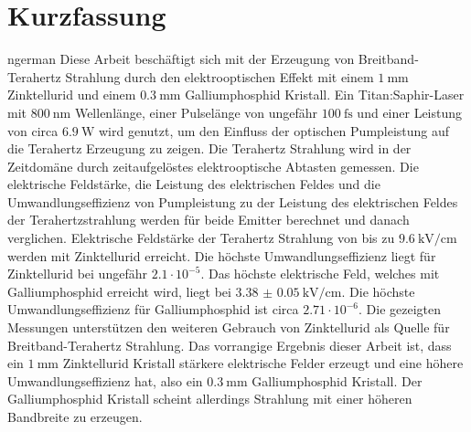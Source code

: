 \section*{Kurzfassung}
\begin{foreignlanguage}{ngerman}
Diese Arbeit beschäftigt sich mit der Erzeugung von Breitband-Terahertz Strahlung durch den elektrooptischen Effekt mit einem $\SI{1}{\milli\meter}$ Zinktellurid und einem $\SI{0.3}{\milli\meter}$ Galliumphosphid Kristall.
Ein Titan:Saphir-Laser mit $\SI{800}{\nano\meter}$ Wellenlänge, einer Pulselänge von ungefähr $\SI{100}{\femto\second}$ und einer Leistung von circa $\SI{6.9}{\W}$ wird genutzt, um den Einfluss der optischen Pumpleistung auf die Terahertz Erzeugung zu zeigen.
Die Terahertz Strahlung wird in der Zeitdomäne durch zeitaufgelöstes elektrooptische Abtasten gemessen.
Die elektrische Feldstärke, die Leistung des elektrischen Feldes und die Umwandlungseffizienz von Pumpleistung zu der Leistung des elektrischen Feldes der Terahertzstrahlung werden für beide Emitter berechnet und danach verglichen.
Elektrische Feldstärke der Terahertz Strahlung von bis zu $\SI{9.6}{\kilo\V\per\centi\meter}$ werden mit Zinktellurid erreicht.
Die höchste Umwandlungseffizienz liegt für Zinktellurid bei ungefähr $2.1\cdot 10^{-5}$.
Das höchste elektrische Feld, welches mit Galliumphosphid erreicht wird, liegt bei $\SI{3.38(5)}{\kilo\V\per\centi\meter}$.
Die höchste Umwandlungseffizienz für Galliumphosphid ist circa $2.71\cdot 10^{-6}$.
Die gezeigten Messungen unterstützen den weiteren Gebrauch von Zinktellurid als Quelle für Breitband-Terahertz Strahlung.
Das vorrangige Ergebnis dieser Arbeit ist, dass ein  $\SI{1}{\milli\meter}$ Zinktellurid Kristall stärkere elektrische Felder erzeugt und eine höhere Umwandlungseffizienz hat, also ein $\SI{0.3}{\milli\meter}$ Galliumphosphid Kristall.
Der Galliumphosphid Kristall scheint allerdings Strahlung mit einer höheren Bandbreite zu erzeugen.
\end{foreignlanguage}